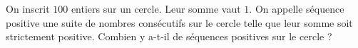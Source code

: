 On inscrit $100$ entiers sur un cercle. Leur somme vaut $1$. On appelle séquence positive une suite de nombres consécutifs sur le cercle telle que leur somme soit strictement positive. Combien y a-t-il de séquences positives sur le cercle ?